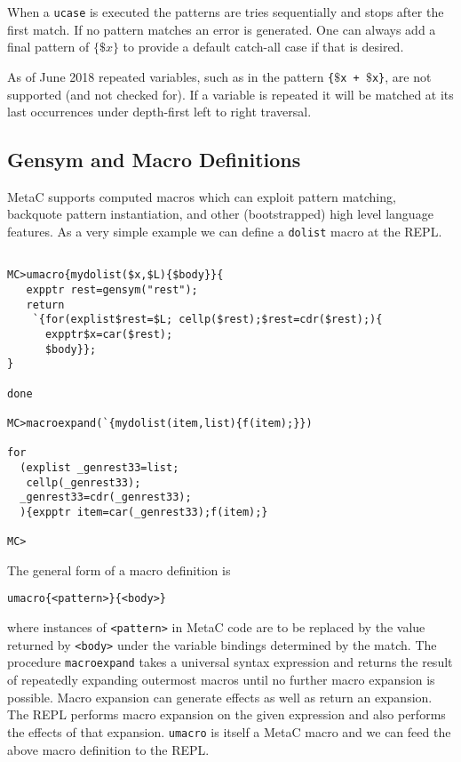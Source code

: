 \documentclass{article}
\begin{document}
When a {\tt ucase} is executed the patterns are tries sequentially and stops after the first match.  If no pattern matches an error is generated.  One can always add a final pattern of $\{\$x\}$ to provide a default
catch-all case if that is desired.

As of June 2018 repeated variables, such as in the pattern {\tt \{$\$$x + $\$$x\}}, are not supported (and not checked for).
If a variable is repeated it will be matched at its last occurrences under depth-first left to right traversal.

\subsection{Gensym and Macro Definitions}

MetaC supports computed macros which can exploit pattern matching, backquote pattern instantiation, and other (bootstrapped) high level language features.
As a very simple example we can define a {\tt dolist} macro at the REPL.

\begin{verbatim}

MC>umacro{mydolist($x,$L){$body}}{
   expptr rest=gensym("rest");
   return
    `{for(explist$rest=$L; cellp($rest);$rest=cdr($rest);){
      expptr$x=car($rest);
      $body}};
}

done

MC>macroexpand(`{mydolist(item,list){f(item);}})

for
  (explist _genrest33=list;
   cellp(_genrest33);
  _genrest33=cdr(_genrest33);
  ){expptr item=car(_genrest33);f(item);}

MC>
\end{verbatim}

The general form of a macro definition is
\begin{verbatim}
umacro{<pattern>}{<body>}
\end{verbatim}
where instances of {\tt <pattern>} in MetaC code are to be replaced by the value returned by {\tt <body>} under the variable bindings determined by the match.
The procedure {\tt macroexpand} takes a universal syntax expression
and returns the result of repeatedly expanding outermost macros until no further macro expansion is possible.  Macro expansion can generate effects as well as return an expansion.  The REPL performs
macro expansion on the given expression and also performs the effects of that expansion.  {\tt umacro} is itself a MetaC macro and we can feed the above macro definition to the REPL.
\end{document}
